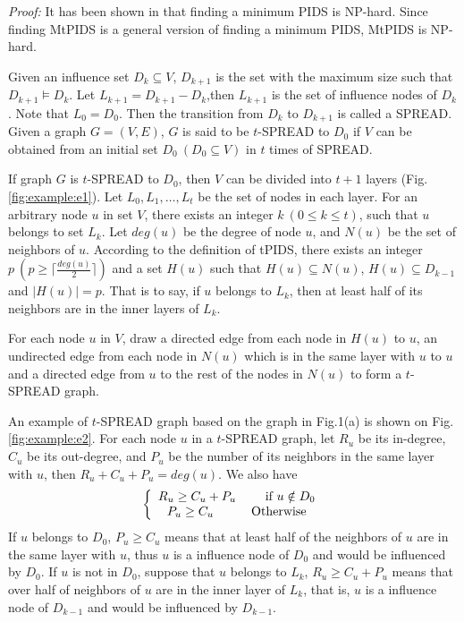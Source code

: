 \emph{Proof:} It has been shown in \cite{WDC2011} that finding a minimum PIDS is NP-hard.
Since finding MtPIDS is a general version of finding a minimum PIDS, MtPIDS is NP-hard.
\begin{definition}[$t$-SPREAD]
	Given an influence set $D_k \subseteq V$, $D_{k+1}$ is the set with the maximum size such that $D_{k+1} \models D_k$.
	Let $L_{k+1} = D_{k+1}-D_k$,then $L_{k+1}$ is the set of influence nodes of $D_k$.
	Note that $L_0 = D_0$.
	Then the transition from $D_k$ to $D_{k+1}$ is called a SPREAD.
	Given a graph $G = (V , E)$, $G$ is said to be $t$-SPREAD to $D_0$ if $V$ can be obtained from an initial set $D_0~(D_0 \subseteq V)$ in $t$ times of SPREAD.
\end{definition}
If graph $G$ is $t$-SPREAD to $D_0$, then $V$ can be divided into $t+1$ layers (Fig.\ref{fig:example:e1}).
Let $L_0,L_1,\dots,L_t$ be the set of nodes in each layer.
For an arbitrary node $u$ in set $V$, there exists an integer $k~(0\le k\le t)$, such that $u$ belongs to set $L_k$.
Let $deg(u)$ be the degree of node $u$, and $N(u)$ be the set of neighbors of $u$.
According to the definition of tPIDS, there exists an integer $p ~(p\ge \lceil \frac{deg(u)}{2}\rceil)$ and a set $H(u)$ such that $H(u) \subseteq N(u)$, $H(u) \subseteq D_{k-1}$ and $|H(u)|=p$.
That is to say, if $u$ belongs to $L_k$, then at least half of its neighbors  are in the inner layers of $L_k$.
\begin{definition}
	For each node $u$ in $V$, draw a directed edge from each node in $H(u)$ to $u$, an undirected edge from each node in $N(u)$ which is in the same layer with $u$ to $u$ and a directed edge from $u$ to the rest of the nodes in $N(u)$ to form a $t$-SPREAD graph.
\end{definition}
An example of $t$-SPREAD graph based on the graph in Fig.1(a) is shown on Fig.\ref{fig:example:e2}.
For each node $u$ in a $t$-SPREAD graph, let $R_u$ be its in-degree, $C_u$ be its out-degree, and $P_u$ be the number of its neighbors in the same layer with $u$, then $R_u+C_u+P_u=deg(u)$.
We also have
\begin{equation}
	\left\{ {\begin{array}{*{20}c}
			R_u\ge C_u+P_u \text{~~~~~~~if~} u \notin D_0\\
			P_u \ge C_u~~~~~~\text{~~~Otherwise}\\
		\end{array}} \right.
	\end{equation}
	If $u$ belongs to $D_0$, $P_u \ge C_u$ means that at least half of the neighbors of $u$ are in the same layer with $u$, thus $u$ is a influence node of $D_0$ and would be influenced by $D_0$. If $u$ is not in $D_0$, suppose that $u$ belongs to $L_k$, $R_u\ge C_u+P_u$ means that over half of neighbors of $u$ are in the inner layer of $L_k$, that is, $u$ is a influence node of $D_{k-1}$ and would be influenced by $D_{k-1}$.

